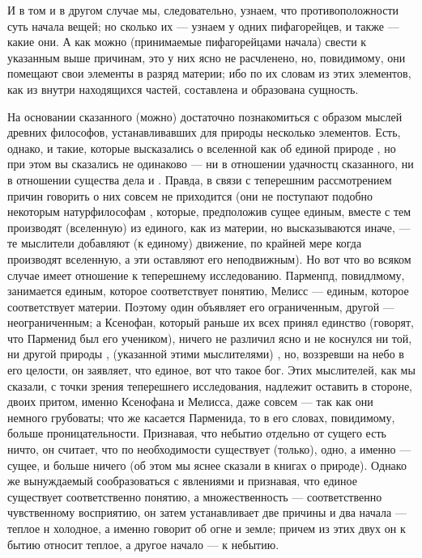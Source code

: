 \documentclass{article}
\begin{document}
{И в том и в другом случае мы, следовательно, узнаем, что противоположности суть начала вещей; но сколько их --- узнаем у одних пифагорейцев, и также --- какие они. А как можно (принимаемые пифагорейцами начала) свести к указанным выше причинам, это у них
\footnotemark[5]
ясно не расчленено, но, повидимому, они помещают свои элементы в разряд материи; ибо по их словам из этих элементов, как из внутри находящихся частей, составлена и образована сущность.

На основании сказанного (можно) достаточно познакомиться с образом мыслей древних философов, устанавливавших для природы несколько элементов. Есть, однако, и такие, которые высказались о вселенной как об единой природе , но при этом вы сказались не одинаково --- ни в отношении удачностц сказанного, ни в отношении существа дела и . Правда, в связи с теперешним рассмотрением причин говорить о них совсем не приходится (они не поступают подобно некоторым натурфилософам , которые, предположив сущее единым, вместе с тем производят (вселенную) из единого, как из материи, но высказываются иначе, --- те мыслители добавляют (к единому) движение, по крайней мере когда производят вселенную, а эти оставляют его неподвижным). Но вот что во всяком случае имеет отношение к теперешнему исследованию. Парменпд, повидлмому, занимается единым, которое соответствует понятию,
\footnotemark[6]
Мелисс --- единым, которое соответствует материи. Поэтому один объявляет его ограниченным, другой --- неограниченным; а Ксенофан, который раньше их всех принял единство (говорят, что Парменид был его учеником), ничего не различил ясно и не коснулся ни той, ни другой природы , (указанной этими мыслителями) , но, воззревши на небо в его целости, он заявляет, что единое, вот что такое бог. Этих мыслителей, как мы сказали, с точки зрения теперешнего исследования, надлежит оставить в стороне, двоих притом, именно Ксенофана и Мелисса, даже совсем --- так как они немного грубоваты; что же касается Парменида, то в его словах, повидимому, больше проницательности. Признавая, что небытио отдельно от сущего есть ничто, он считает, что по необходимости существует (только), одно, а именно --- сущее, и больше ничего (об этом мы яснее сказали в книгах о природе).
\footnotemark[7]
Однако же вынуждаемый сообразоваться с явлениями и признавая, что единое существует соответственно понятию, а множественность --- соответственно чувственному восприятию, он затем устанавливает две причины и два начала --- теплое н холодное, а именно говорит об огне и земле; причем из этих двух он к бытию относит теплое, а другое начало --- к небытию.

}
\end{document}
